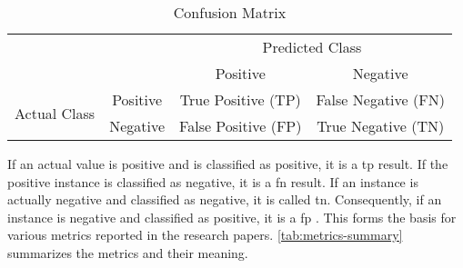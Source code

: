 \begin{table}[ht]
\centering
\caption{Confusion Matrix}
\label{tab:confusion-matrix}
\renewcommand{\arraystretch}{1.25}
\begin{tabular}{cc|c|c|}
\cline{3-4}
& & \multicolumn{2}{c|}{Predicted Class} \\ \cline{3-4} 
& & Positive & Negative \\ \hline
\multicolumn{1}{|c|}{\multirow{2}{*}{Actual Class}} & Positive & True Positive (TP) & False Negative (FN) \\ \cline{2-4} 
\multicolumn{1}{|c|}{} & Negative & False Positive (FP) & True Negative (TN) \\ \hline
\end{tabular}
\end{table}

\noindent If an actual value is positive and is classified as positive, it is a \gls{tp} result. If the positive instance is classified as negative, it is a \gls{fn} result. If an instance is actually negative and classified as negative, it is called \gls{tn}. Consequently, if an instance is negative and classified as positive, it is a \gls{fp} \cite{Fawcett2006}. This forms the basis for various metrics reported in the research papers. \autoref{tab:metrics-summary} summarizes the metrics and their meaning. 


